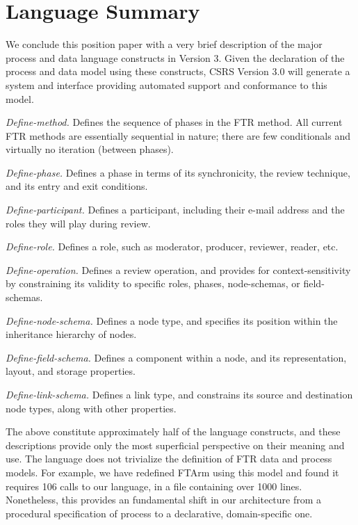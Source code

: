 \section{Language Summary}

We conclude this position paper with a very brief description of the major
process and data language constructs in Version 3.  Given the declaration
of the process and data model using these constructs, CSRS Version 3.0 will
generate a system and interface providing automated support and conformance
to this model.

\begin{itemizenoindent}
  \item {\em Define-method.}  Defines the sequence of phases in the FTR
  method. All current FTR methods are essentially sequential in nature;
  there are few conditionals and virtually no iteration (between phases).
  \item {\em Define-phase.} Defines a phase in terms of its synchronicity,
  the review technique, and its entry and exit conditions.
  \item {\em Define-participant.}  Defines a participant, including their
  e-mail address and the roles they will play during review.
  \item {\em Define-role.}  Defines a role, such as moderator, producer,
  reviewer, reader, etc.
  \item {\em Define-operation.} Defines a review operation, and provides
  for context-sensitivity by constraining its validity to specific roles,
  phases, node-schemas, or field-schemas.  
  \item {\em Define-node-schema.}  Defines a node type, and specifies its
  position within the inheritance hierarchy of nodes.
  \item {\em Define-field-schema.}  Defines a component within a node, and
  its representation, layout, and storage properties. 
  \item {\em Define-link-schema.} Defines a link type, and constrains its
  source and destination node types, along with other properties. 
\end{itemizenoindent}

The above constitute approximately half of the language constructs, and
these descriptions provide only the most superficial perspective on their
meaning and use.  The language does not trivialize the definition of FTR
data and process models.  For example, we have redefined FTArm using this
model and found it requires 106 calls to our language, in a file containing
over 1000 lines.  Nonetheless, this provides an fundamental shift in our
architecture from a procedural specification of process to a declarative,
domain-specific one.

